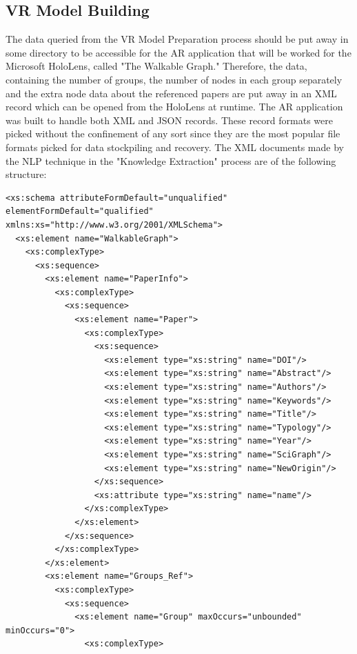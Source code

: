 \documentclass[12pt,a4paper,oneside,american,parskip=half]{article}
\begin{document}
\begin{justify}
\begin{normalsize}
\subsection{VR Model Building}
The data queried from the VR Model Preparation process should be put away in some directory to be accessible for the AR application that will be worked for the Microsoft HoloLens, called "The Walkable Graph."
\newline
Therefore, the data, containing the number of groups, the number of nodes in each group separately and the extra node data about the referenced papers are put away in an XML record which can be opened from the HoloLens at runtime. The AR application was built to handle both XML and JSON records.
These record formats were picked without the confinement of any sort since they are the most popular file formats picked for data stockpiling and recovery.
The XML documents made by the NLP technique in the "Knowledge Extraction" process are of the following structure:
\newline
\begin{lstlisting}[basicstyle=\tiny, caption={The used XML Scheme}]
<xs:schema attributeFormDefault="unqualified" elementFormDefault="qualified" xmlns:xs="http://www.w3.org/2001/XMLSchema">
  <xs:element name="WalkableGraph">
    <xs:complexType>
      <xs:sequence>
        <xs:element name="PaperInfo">
          <xs:complexType>
            <xs:sequence>
              <xs:element name="Paper">
                <xs:complexType>
                  <xs:sequence>
                    <xs:element type="xs:string" name="DOI"/>
                    <xs:element type="xs:string" name="Abstract"/>
                    <xs:element type="xs:string" name="Authors"/>
                    <xs:element type="xs:string" name="Keywords"/>
                    <xs:element type="xs:string" name="Title"/>
                    <xs:element type="xs:string" name="Typology"/>
                    <xs:element type="xs:string" name="Year"/>
                    <xs:element type="xs:string" name="SciGraph"/>
                    <xs:element type="xs:string" name="NewOrigin"/>
                  </xs:sequence>
                  <xs:attribute type="xs:string" name="name"/>
                </xs:complexType>
              </xs:element>
            </xs:sequence>
          </xs:complexType>
        </xs:element>
        <xs:element name="Groups_Ref">
          <xs:complexType>
            <xs:sequence>
              <xs:element name="Group" maxOccurs="unbounded" minOccurs="0">
                <xs:complexType>

\end{lstlisting}
\end{normalsize}
\end{justify}
\end{document}
